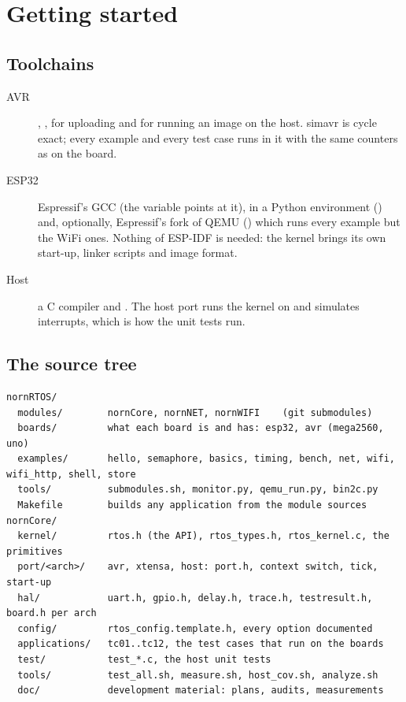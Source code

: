 \chapter{Getting started}
\label{ch:start}

\section{Toolchains}

\begin{description}
\item[AVR] , ,  for uploading and
   for running an image on the host. simavr is cycle exact; every example
  and every test case runs in it with the same counters as on the board.
\item[ESP32] Espressif's  GCC (the variable 
  points at it),  in a Python environment () and,
  optionally, Espressif's fork of QEMU () which runs every example but
  the WiFi ones. Nothing of ESP-IDF is needed: the kernel brings its own start-up, linker
  scripts and image format.
\item[Host] a C compiler and . The host port runs the kernel on
   and simulates interrupts, which is how the unit tests run.
\end{description}

\section{The source tree}

\begin{lstlisting}[language={}]
nornRTOS/
  modules/        nornCore, nornNET, nornWIFI    (git submodules)
  boards/         what each board is and has: esp32, avr (mega2560, uno)
  examples/       hello, semaphore, basics, timing, bench, net, wifi, wifi_http, shell, store
  tools/          submodules.sh, monitor.py, qemu_run.py, bin2c.py
  Makefile        builds any application from the module sources
nornCore/
  kernel/         rtos.h (the API), rtos_types.h, rtos_kernel.c, the primitives
  port/<arch>/    avr, xtensa, host: port.h, context switch, tick, start-up
  hal/            uart.h, gpio.h, delay.h, trace.h, testresult.h, board.h per arch
  config/         rtos_config.template.h, every option documented
  applications/   tc01..tc12, the test cases that run on the boards
  test/           test_*.c, the host unit tests
  tools/          test_all.sh, measure.sh, host_cov.sh, analyze.sh
  doc/            development material: plans, audits, measurements
\end{lstlisting}

